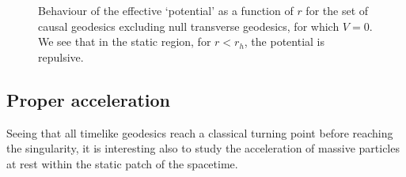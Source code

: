 \begin{figure}[h!]
\centering
{}
\caption[Plot of the effective potential for the motion of geodesics for the planar symmetric solution of Einstein-Maxwell theory]{Behaviour of the effective `potential' as a function of $r$ for the set of causal geodesics excluding null transverse geodesics, for which $V=0$. We see that in the static region, for $r < r_h$, the potential is repulsive.}
\label{fig:3pot}
\end{figure}


\subsection*{Proper acceleration}
Seeing that all timelike geodesics reach a classical turning point before reaching the singularity, it is interesting also to study the acceleration of massive particles at rest within the static patch of the spacetime.

